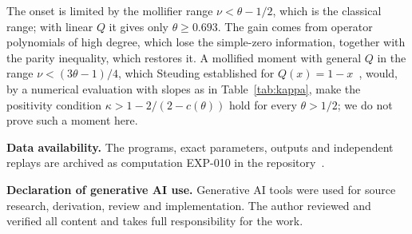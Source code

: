 \documentclass[11pt]{article}
\theoremstyle{remark}
\begin{document}
The onset is limited by the mollifier range $\nu<\theta-1/2$, which is the
classical range; with linear $Q$ it gives only $\theta\ge0.693$. The gain
comes from operator polynomials of high degree, which lose the simple-zero
information, together with the parity inequality, which restores it. A
mollified moment with general $Q$ in the range $\nu<(3\theta-1)/4$, which
Steuding established for $Q(x)=1-x$~\cite{SteudingThesis}, would, by a
numerical evaluation with slopes as in Table~\ref{tab:kappa}, make the
positivity condition $\kappa>1-2/(2-c(\theta))$ hold for every $\theta>1/2$;
we do not prove such a moment here.

\medskip
\noindent\textbf{Data availability.} The programs, exact parameters, outputs
and independent replays are archived as computation EXP-010 in the
repository~\cite{Record}.

\medskip
\noindent\textbf{Declaration of generative AI use.} Generative AI tools were
used for source research, derivation, review and implementation. The author
reviewed and verified all content and takes full responsibility for the work.
\end{document}
